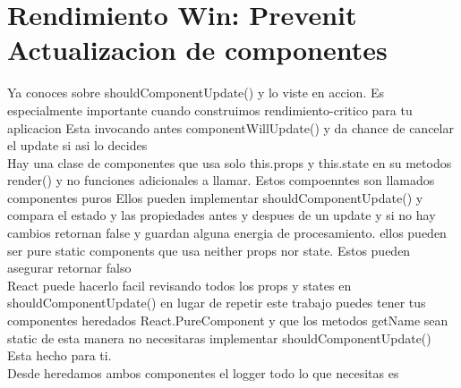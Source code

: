 \section{Rendimiento Win: Prevenit Actualizacion de componentes}
Ya conoces sobre shouldComponentUpdate() y lo viste en accion.
Es especialmente importante cuando construimos rendimiento-critico  para tu aplicacion Esta invocando antes componentWillUpdate() y da chance de cancelar el update si asi lo decides\\
Hay una clase de componentes que usa solo this.props y this.state en su metodos render() y no funciones adicionales a llamar. Estos compoenntes son llamados componentes puros  Ellos pueden implementar shouldComponentUpdate() y compara el estado y las propiedades antes y despues de un update y si no hay cambios retornan false y guardan alguna energia de procesamiento. ellos pueden ser pure static components que usa neither props nor state. Estos pueden asegurar retornar falso\\
React puede hacerlo facil revisando todos los props y states en shouldComponentUpdate() en lugar de repetir este trabajo puedes tener tus componentes heredados React.PureComponent y que los metodos getName sean static de esta manera no necesitaras implementar shouldComponentUpdate() Esta hecho para ti. \\
Desde heredamos ambos componentes  el logger todo lo que necesitas es

